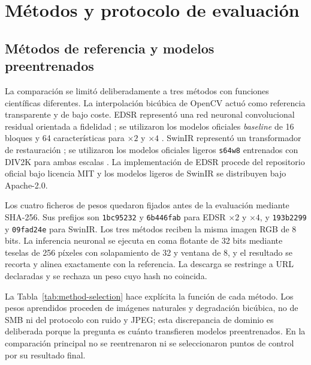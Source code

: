 \chapter{Métodos y protocolo de evaluación}

\section{Métodos de referencia y modelos preentrenados}
La comparación se limitó deliberadamente a tres métodos con funciones científicas diferentes. La
interpolación bicúbica de OpenCV actuó como referencia transparente y de bajo coste. EDSR representó
una red neuronal convolucional residual orientada a fidelidad \cite{lim2017edsr}; se utilizaron los
modelos oficiales \emph{baseline} de 16 bloques y 64 características para \(\times 2\) y
\(\times 4\) \cite{edsrOfficialRepository}. SwinIR representó un transformador de restauración \cite{liang2021swinir}; se
utilizaron los modelos oficiales ligeros \texttt{s64w8} entrenados con DIV2K para ambas escalas
\cite{swinirOfficialRepository}.
La implementación de EDSR procede del repositorio oficial bajo licencia MIT y los modelos ligeros
de SwinIR se distribuyen bajo Apache-2.0.

Los cuatro ficheros de pesos quedaron fijados antes de la evaluación mediante SHA-256. Sus
prefijos son \texttt{1bc95232} y \texttt{6b446fab} para EDSR \(\times 2\) y \(\times 4\), y
\texttt{193b2299} y \texttt{09fad24e} para SwinIR. Los tres métodos reciben la misma imagen RGB de
8 bits. La inferencia neuronal se ejecuta en coma flotante de 32 bits mediante teselas de
256 píxeles con solapamiento de 32 y ventana de 8, y el resultado se recorta y alinea exactamente
con la referencia. La descarga se restringe a URL declaradas y se rechaza un peso cuyo hash no
coincida.

La Tabla~\ref{tab:method-selection} hace explícita la función de cada método. Los pesos aprendidos
proceden de imágenes naturales y degradación bicúbica, no de SMB ni del protocolo con ruido y JPEG;
esta discrepancia de dominio es deliberada porque la pregunta es cuánto transfieren modelos
preentrenados. En la comparación principal no se reentrenaron ni se seleccionaron puntos de
control por su resultado final.

